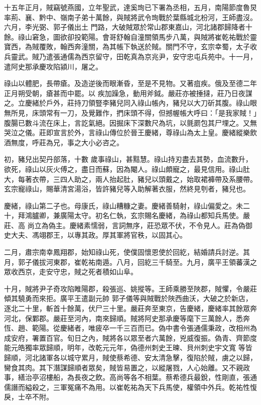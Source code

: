 \begin{pinyinscope}
 十五年正月，賊竊號燕國，立年聖武，達奚珣已下署為丞相，五月，南陽節度魯炅率荊、襄、黔中、嶺南子弟十萬餘，與賊將武令珣戰於葉縣城北枌河，王師盡沒。六月，李光弼、郭子儀出土
 門路，大破賊眾於常山郡東嘉山，河北諸郡歸降者十餘。祿山窘急，圖欲卻投範陽。會哥舒翰自潼關領馬步八萬，與賊將崔乾祐戰於靈寶西，為賊覆敗，翰西奔潼關，為其帳下執送於賊。關門不守，玄宗幸蜀，太子收兵靈武。賊乃遣張通儒為西京留守，田乾真為京兆尹，安守忠屯兵苑中。十一月，遣阿史那承慶攻陷潁川，屠之。



 祿山以體肥，長帶瘡。及造逆後而眼漸昏，至是不見物。又著疽疾。俄及至德二年正月朔受朝，瘡甚而中罷。以
 疾加躁急，動用斧鉞。嚴莊亦被捶撻，莊乃日夜謀之。立慶緒於戶外，莊持刀領豎李豬兒同入祿山帳內，豬兒以大刀斫其腹。祿山眼無所見，床頭常有一刀，及覺難作，捫床頭不得，但撼幄帳大呼曰：「是我家賊！」腹腸已數斗流在床上，言訖氣絕。因掘床下深數尺為坑，以氈罽包其尸埋之。又無哭泣之儀。莊即宣言於外，言祿山傳位於晉王慶緒，尊祿山為太上皇。慶緒縱樂飲酒無度，呼莊為兄，事之大小必咨之。



 初，豬兒出契丹部落，十數
 歲事祿山，甚黠慧。祿山持刃盡去其勢，血流數升，欲死，祿山以灰火傅之，盡日而蘇，因為閹人。祿山頗寵之，最見信用。祿山肚大，每著衣帶，三四人助之，兩人抬起肚，豬兒以頭戴之，始取裙褲帶及系腰帶。玄宗寵祿山，賜華清宮湯浴，皆許豬兒等入助解著衣服，然終見刳者，豬兒也。



 慶緒，祿山第二子也。母康氏，祿山糟糠之妻。慶緒善騎射，祿山偏愛之。未二十，拜鴻臚卿，兼廣陽太守。初名仁執，玄宗賜名慶緒，為祿山都知兵馬使。嚴莊、高
 尚立為偽主。慶緒素懦弱，言詞無序，莊恐眾不伏，不令見人。莊為偽御史大夫、馮翊郡王，以專其政。厚其軍將官秩，以固其心。



 二月，肅宗南幸鳳翔郡，始知祿山死，使僕固懷恩使於回紇，結婚請兵討逆。其月，郭子儀拔河東郡，崔乾祐南遁。八月，回紇三千騎至。九月，廣平王領蕃漢之眾收西京，走安守忠，賊之死者積如山阜。



 十月，賊將尹子奇攻陷睢陽郡，殺張巡、姚摐等。王師乘勝至陜郡，賊懼，令嚴莊傾其驍勇而來拒。廣平王遣副元帥
 郭子儀等與賊戰於陜西曲沃，大破之於新店，逐北二十里，斬首十餘萬，伏尸三十里。嚴莊奔至東京，告慶緒，慶緒率其餘眾奔河北，保鄴郡。嚴莊至河內，南來歸順。賊將阿史那承慶等麾下三萬餘人，悉奔恆、趙、範陽。從慶緒者，唯疲卒一千三百而已。偽中書令張通儒秉政，改相州為成安府，署置百官。旬日之內，賊將各以眾至者六萬餘，兇威復振。偽青、齊節度能元皓獨率眾歸順，明年，改乾元元年，偽德州刺史王暕、貝州刺史宇文寬
 等皆歸順，河北諸軍各以城守累月，賊使蔡希德、安太清急擊，復陷於賊，虜之以歸，臠食其肉。其下潛謀歸順者眾矣，賊皆易置之，以縱屠戮，人心始離。又不親政事，繕治亭沼樓船，為長夜之飲。高尚等各不相葉。蔡希德兵最銳，性剛直，張通儒譖而縊殺之，三軍冤痛不為用。以崔乾祐為天下兵馬使，權領中外兵。乾祐性愎戾，士卒不附。




\end{pinyinscope}
